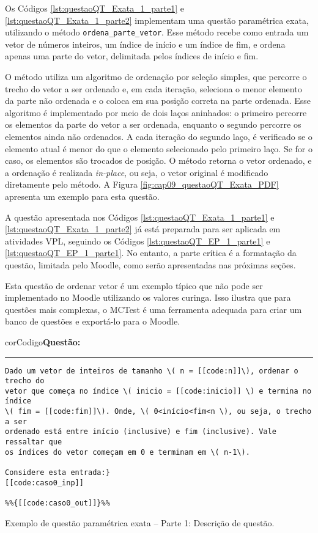 Os Códigos \ref{lst:questaoQT_Exata_1_parte1} e \ref{lst:questaoQT_Exata_1_parte2} implementam uma questão paramétrica exata, utilizando o método \verb|ordena_parte_vetor|. Esse método recebe como entrada um vetor de números inteiros, um índice de início e um índice de fim, e ordena apenas uma parte do vetor, delimitada pelos índices de início e fim.

O método utiliza um algoritmo de ordenação por seleção simples, que percorre o trecho do vetor a ser ordenado e, em cada iteração, seleciona o menor elemento da parte não ordenada e o coloca em sua posição correta na parte ordenada. Esse algoritmo é implementado por meio de dois laços aninhados: o primeiro percorre os elementos da parte do vetor a ser ordenada, enquanto o segundo percorre os elementos ainda não ordenados. A cada iteração do segundo laço, é verificado se o elemento atual é menor do que o elemento selecionado pelo primeiro laço. Se for o caso, os elementos são trocados de posição.
%
O método retorna o vetor ordenado, e a ordenação é realizada \textit{in-place}, ou seja, o vetor original é modificado diretamente pelo método. A Figura \ref{fig:cap09_questaoQT_Exata_PDF} apresenta um exemplo para esta questão.

A questão apresentada nos Códigos \ref{lst:questaoQT_Exata_1_parte1} e \ref{lst:questaoQT_Exata_1_parte2} já está preparada para ser aplicada em atividades VPL, seguindo os Códigos \ref{lst:questaoQT_EP_1_parte1} e \ref{lst:questaoQT_EP_1_parte1}. No entanto, a parte crítica é a formatação da questão, limitada pelo Moodle, como serão apresentadas nas próximas seções.

Esta questão de ordenar vetor é um exemplo típico que não pode ser implementado no Moodle utilizando os valores curinga. Isso ilustra que para questões mais complexas, o MCTest é uma ferramenta adequada para criar um banco de questões e exportá-lo para o Moodle.


\begin{listing}[!ht]
\begin{myboxCode}{corCodigo}{\textbf{Questão: }}\vspace{3mm}
\hrule
\begin{verbatim}
Dado um vetor de inteiros de tamanho \( n = [[code:n]]\), ordenar o trecho do 
vetor que começa no índice \( inicio = [[code:inicio]] \) e termina no índice 
\( fim = [[code:fim]]\). Onde, \( 0<início<fim<n \), ou seja, o trecho a ser
ordenado está entre início (inclusive) e fim (inclusive). Vale ressaltar que 
os índices do vetor começam em 0 e terminam em \( n-1\). 

Considere esta entrada:} 
[[code:caso0_inp]]

%%{[[code:caso0_out]]}%%
\end{verbatim}
\end{myboxCode}
\caption{Exemplo de questão paramétrica exata -- Parte 1: Descrição de questão.}
\label{lst:questaoQT_Exata_1_parte1}
\end{listing}

